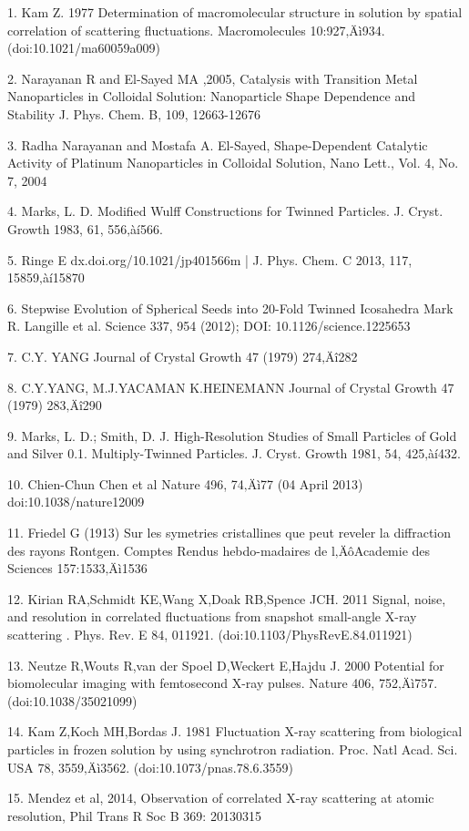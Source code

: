 \documentclass [11pt,fleqn]{article}
\begin{document}
1. Kam Z. 1977 Determination of macromolecular structure in solution by spatial correlation of scattering fluctuations. Macromolecules 10:927‚Äì934. (doi:10.1021/ma60059a009)

2. Narayanan R and El-Sayed MA ,2005, Catalysis with Transition Metal Nanoparticles in Colloidal Solution: Nanoparticle Shape Dependence and Stability J. Phys. Chem. B, 109, 12663-12676

3. Radha Narayanan and Mostafa A. El-Sayed, Shape-Dependent Catalytic Activity of Platinum Nanoparticles in Colloidal Solution, Nano Lett., Vol. 4, No. 7, 2004

4. Marks, L. D. Modified Wulff Constructions for Twinned Particles. J. Cryst. Growth 1983, 61, 556‚àí566.

5. Ringe E dx.doi.org/10.1021/jp401566m | J. Phys. Chem. C 2013, 117, 15859‚àí15870

6. Stepwise Evolution of Spherical Seeds into 20-Fold Twinned Icosahedra Mark R. Langille et al. Science 337, 954 (2012); DOI: 10.1126/science.1225653

7. C.Y. YANG Journal of Crystal Growth 47 (1979) 274‚Äî282

8. C.Y.YANG, M.J.YACAMAN K.HEINEMANN Journal of Crystal Growth 47 (1979) 283‚Äî290

9. Marks, L. D.; Smith, D. J. High-Resolution Studies of Small Particles of Gold and Silver 0.1. Multiply-Twinned Particles. J. Cryst. Growth 1981, 54, 425‚àí432.

10. Chien-Chun Chen et al Nature 496, 74‚Äì77 (04 April 2013) doi:10.1038/nature12009

11. Friedel G (1913) Sur les symetries cristallines que peut reveler la diffraction des rayons Rontgen. Comptes Rendus hebdo-madaires de l‚ÄôAcademie des Sciences 157:1533‚Äì1536

12. Kirian RA,Schmidt KE,Wang X,Doak RB,Spence JCH. 2011 Signal, noise, and resolution in correlated fluctuations from snapshot small-angle X-ray scattering . Phys. Rev. E 84, 011921. (doi:10.1103/PhysRevE.84.011921)

13. Neutze R,Wouts R,van der Spoel D,Weckert E,Hajdu J. 2000 Potential for biomolecular imaging with femtosecond X-ray pulses. Nature 406, 752‚Äì757. (doi:10.1038/35021099)

14. Kam Z,Koch MH,Bordas J. 1981 Fluctuation X-ray scattering from biological particles in frozen solution by using synchrotron radiation. Proc. Natl Acad. Sci. USA 78, 3559‚Äì3562. (doi:10.1073/pnas.78.6.3559)

15. Mendez et al, 2014,  Observation of correlated X-ray scattering at atomic resolution, Phil Trans R Soc B 369: 20130315
\end{document}
